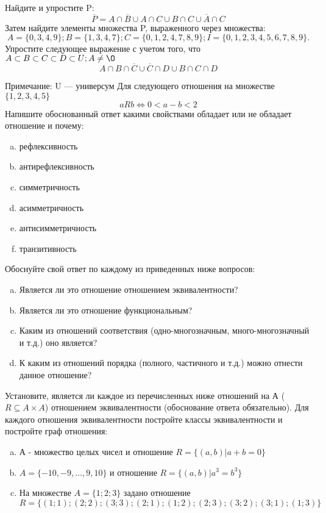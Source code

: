 \documentclass[10pt]{exam}
\begin{document}
\begin{questions}
\question
Найдите и упростите P:
\begin{equation*}
\overline{P} = A \cap \overline{B} \cup A \cap C \cup B \cap C \cup \overline{A} \cap C
\end{equation*}
Затем найдите элементы множества P, выраженного через множества:
\begin{equation*}
A = \{0, 3, 4, 9\}; 
B = \{1, 3, 4, 7\};
C = \{0, 1, 2, 4, 7, 8, 9\};
I = \{0, 1, 2, 3, 4, 5, 6, 7, 8, 9\}.
\end{equation*}\question
Упростите следующее выражение с учетом того, что $A\subset B \subset C \subset D \subset U; A \neq \O$
\begin{equation*}
A \cap B  \cap \overline{C} \cup \overline{C} \cap D \cup B \cap C \cap D
\end{equation*}

Примечание: U — универсум\question
Для следующего отношения на множестве $\{1, 2, 3, 4, 5\}$ 
\begin{equation*}
aRb \iff 0 < a-b<2
\end{equation*}
Напишите обоснованный ответ какими свойствами обладает или не обладает отношение и почему:   
\begin{enumerate} [a)]\setcounter{enumi}{0}
\item рефлексивность
\item антирефлексивность
\item симметричность
\item асимметричность
\item антисимметричность
\item транзитивность
\end{enumerate}

Обоснуйте свой ответ по каждому из приведенных ниже вопросов:
\begin{enumerate} [a)]\setcounter{enumi}{0}
    \item Является ли это отношение отношением эквивалентности?
    \item Является ли это отношение функциональным?
    \item Каким из отношений соответствия (одно-многозначным, много-многозначный и т.д.) оно является?
    \item К каким из отношений порядка (полного, частичного и т.д.) можно отнести данное отношение?
\end{enumerate}
\question
Установите, является ли каждое из перечисленных ниже отношений на А ($R \subseteq A \times A$) отношением эквивалентности (обоснование ответа обязательно). Для каждого отношения эквивалентности 
постройте классы эквивалентности и постройте граф отношения:
\begin{enumerate}[a)]\setcounter{enumi}{0}
\item А - множество целых чисел и отношение $R = \{(a,b)|a + b = 0\}$
\item $A = \{-10, -9, …, 9, 10\}$ и отношение $R = \{(a,b)|a^{3} = b^{3}\}$
\item На множестве $A = \{1; 2; 3\}$ задано отношение $R = \{(1; 1); (2; 2); (3; 3); (2; 1); (1; 2); (2; 3); (3; 2); (3; 1); (1; 3)\}$


\end{enumerate}
\end{questions}
\end{document}
